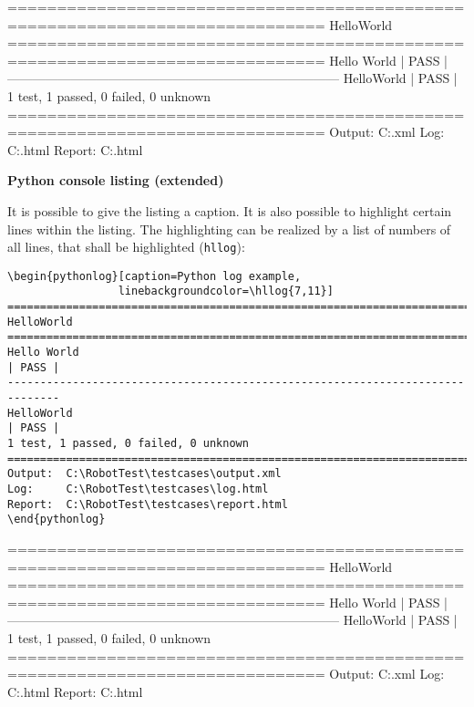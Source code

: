 \documentclass[a4paper,10pt]{report}
\begin{document}
\vspace{2ex}

\begin{pythonlog}
==============================================================================
HelloWorld
==============================================================================
Hello World                                                           | PASS |
------------------------------------------------------------------------------
HelloWorld                                                            | PASS |
1 test, 1 passed, 0 failed, 0 unknown
==============================================================================
Output:  C:\RobotTest\testcases\output.xml
Log:     C:\RobotTest\testcases\log.html
Report:  C:\RobotTest\testcases\report.html
\end{pythonlog}

\vspace{2ex}

\textbf{Python console listing (extended)}

It is possible to give the listing a caption. It is also possible to highlight certain lines within the listing. The highlighting can be realized by a list
of numbers of all lines, that shall be highlighted (\texttt{hllog}):

\vspace{2ex}

\begin{verbatim}
\begin{pythonlog}[caption=Python log example,
                 linebackgroundcolor=\hllog{7,11}]
==============================================================================
HelloWorld
==============================================================================
Hello World                                                           | PASS |
------------------------------------------------------------------------------
HelloWorld                                                            | PASS |
1 test, 1 passed, 0 failed, 0 unknown
==============================================================================
Output:  C:\RobotTest\testcases\output.xml
Log:     C:\RobotTest\testcases\log.html
Report:  C:\RobotTest\testcases\report.html
\end{pythonlog}
\end{verbatim}

\newpage

\begin{pythonlog}[caption=Python log example,
                 linebackgroundcolor=\hllog{7,11}]
==============================================================================
HelloWorld
==============================================================================
Hello World                                                           | PASS |
------------------------------------------------------------------------------
HelloWorld                                                            | PASS |
1 test, 1 passed, 0 failed, 0 unknown
==============================================================================
Output:  C:\RobotTest\testcases\output.xml
Log:     C:\RobotTest\testcases\log.html
Report:  C:\RobotTest\testcases\report.html
\end{pythonlog}
\end{document}
